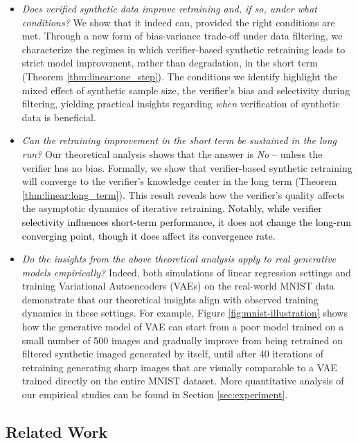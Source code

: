 \begin{itemize}
    \item \emph{Does verified synthetic data improve retraining and, if so, under what conditions?} 
     We show that it indeed can, provided the right conditions are met.
    Through a new form of bias-variance trade-off under data filtering,  we characterize the regimes in which verifier-based synthetic retraining   leads to strict model improvement, rather than  degradation, in   the short term (Theorem \ref{thm:linear:one_step}). The conditions we identify highlight the mixed effect of synthetic sample size, the verifier's bias  and  selectivity  during filtering, yielding practical insights regarding   \emph{when}  verification of synthetic data is beneficial.
    
    \item \emph{Can the retraining improvement in the short term be sustained in the long run?}  Our theoretical analysis shows that the answer is   \emph{No} -- unless the verifier has no bias.
    Formally, we show that verifier-based synthetic retraining  will converge to the verifier's knowledge center in the long term (Theorem \ref{thm:linear:long_term}).
    This result reveals how the verifier's quality affects  the asymptotic dynamics of iterative retraining.
    \textcolor{black}{Notably, while verifier selectivity influences short-term performance, it does not change the long-run converging point, though it does affect its convergence rate.}
    
    \item \emph{Do the insights from the above theoretical analysis apply to real generative models empirically?} Indeed, both simulations of linear regression settings   and  training Variational Autoencoders (VAEs) on the real-world MNIST data demonstrate that our theoretical insights align with observed training dynamics in these settings. For example, Figure \ref{fig:mnist-illustration} shows how the generative model of VAE   can start from a  poor model trained on a small number of 500 images and gradually improve from being retrained on filtered synthetic imaged generated by itself, until after 40 iterations of retraining generating sharp images that are visually comparable to a VAE trained directly on the entire MNIST dataset. More quantitative analysis of our empirical studies can be found in Section \ref{sec:experiment}.     
\end{itemize}



\subsection{Related Work}

